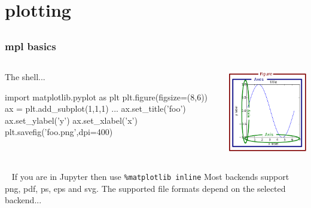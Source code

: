 \documentclass[xcolor=dvipsnames]{beamer}
\newcommand{\highlt}{\textcolor{myorange}}
\begin{document}
\section{plotting}
\subsection{}

\begin{frame}[fragile]
\frametitle{mpl basics}
\scriptsize
\begin{columns}
\begin{column}{5cm}
The shell...
 \begin{code}
  import matplotlib.pyplot as plt
  plt.figure(figsize=(8,6))
  ax = plt.add_subplot(1,1,1)
  ...  
  ax.set_title('foo')
  ax.set_ylabel('y')
  ax.set_xlabel('x')
  plt.savefig('foo.png',dpi=400)
\end{code}
\end{column}

\begin{column}{5cm}
 \begin{center}
  \includegraphics[scale=0.31]{fig_map.png}
\end{center}
\end{column}
\end{columns}

\ \newline
If you are in Jupyter then use \highlt{\texttt{\%matplotlib inline}}
\newline
Most backends support png, pdf, ps, eps and svg.
\newline
The supported file formats depend on the selected backend...
\end{frame}
\end{document}
